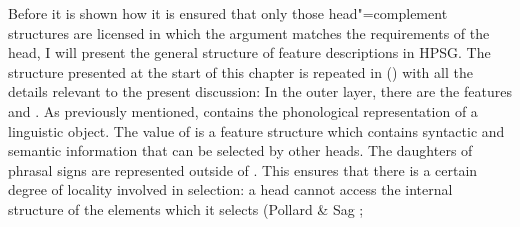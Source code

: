 Before it is shown how it is ensured that only those head"=complement structures are licensed in which the argument matches the requirements of the head, I will
present the general structure of feature descriptions in HPSG. The structure presented at the start of this chapter is repeated in () with all the details
relevant to the present discussion:
\ea
\label{LE-Grammatik}
\z
\addlines
In the outer layer, there are the features \phon and \synsem. As previously mentioned, \phon contains the phonological representation of a linguistic
object. The value of \synsem is a feature structure which contains syntactic and semantic information that can be selected by other heads.
The daughters of phrasal signs are represented outside of \synsem. This ensures that there is a
certain degree of locality involved in selection: a head cannot access the internal
structure of the elements which it selects (Pollard \& Sag \citeyear[--145]{ps};
